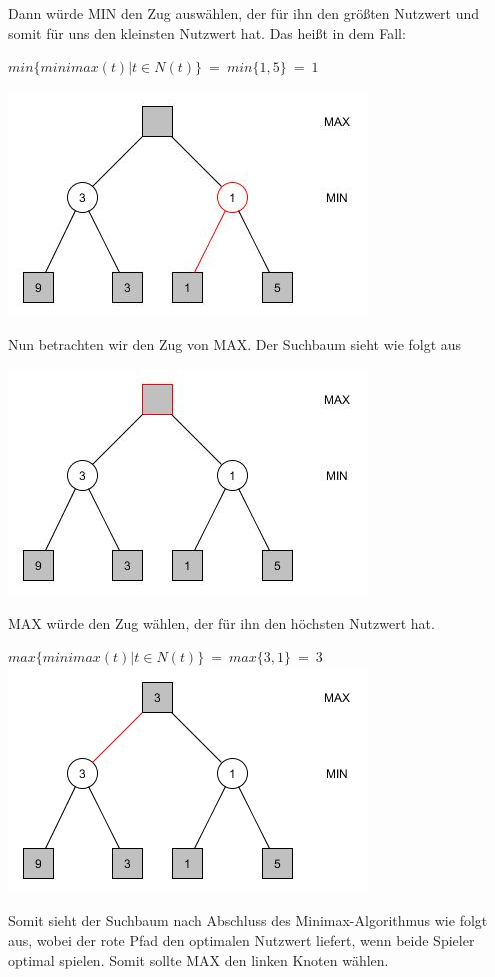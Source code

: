 Dann würde MIN den Zug auswählen, der für ihn den größten Nutzwert und somit für uns den kleinsten Nutzwert hat. Das heißt in dem Fall:
\begin{center}
	$min\{minimax(t) | t \in N(t)\} ~=~ min\{1,5\} ~=~ 1$

	\includegraphics[width = 7 cm]{chapters/minimax/jpg/Graph-Minmax2-4.jpg}
\end{center}

Nun betrachten wir den Zug von MAX. Der Suchbaum sieht wie folgt aus

\begin{center}
	\includegraphics[width = 7 cm]{chapters/minimax/jpg/Graph-Minmax2.jpg}
\end{center}

MAX würde den Zug wählen, der für ihn den höchsten Nutzwert hat.\\

\begin{center}
	$max\{minimax(t) | t \in N(t)\} ~=~ max\{3,1\} ~=~ 3$
	\includegraphics[width = 7 cm]{chapters/minimax/jpg/Graph-Minmax3.jpg}
\end{center}

Somit sieht der Suchbaum nach Abschluss des Minimax-Algorithmus wie folgt aus, wobei der rote Pfad den optimalen Nutzwert liefert, wenn beide Spieler optimal spielen. Somit sollte MAX den linken Knoten wählen.

